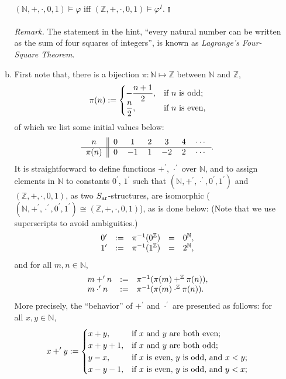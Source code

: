 \begin{enumerate}[1.]
\begin{enumerate}[(a)]
\ \\
\phantom{a} \hfill $(\mathbb{N}, +, \cdot, 0, 1) \models \varphi$ iff $(\mathbb{Z}, +, \cdot, 0, 1) \models \varphi^I$. \hfill $\talloblong$\\
\ \\
\textit{Remark.} The statement in the hint, ``every natural number can be written as the sum of four squares of integers'', is known as \emph{Lagrange's Four-Square Theorem}.
\item First note that, there is a bijection $\pi: \mathbb{N} \mapsto \mathbb{Z}$ between $\mathbb{N}$ and $\mathbb{Z}$,
\[
\pi(n) := \begin{cases}
\displaystyle -\frac{n + 1}{2}, & \mbox{if \(n\) is odd};\cr
\displaystyle \frac{n}{2}, & \mbox{if \(n\) is even},
\end{cases}
\]
of which we list some initial values below:
\[
\begin{tabular}{c||cccccc}
$n$ & $0$ & $1$ & $2$ & $3$ & $4$ & $\cdots$ \\ \hline
$\pi(n)$ & $0$ & $-1$ & $1$ & $-2$ & $2$ & $\cdots$
\end{tabular}.
\]
It is straightforward to define functions $+^\prime$, $\cdot^\prime$ over $\mathbb{N}$, and to assign elements in $\mathbb{N}$ to constants $0^\prime$, $1^\prime$ such that $(\mathbb{N}, +^\prime, \cdot^\prime, 0^\prime, 1^\prime)$ and $(\mathbb{Z}, +, \cdot, 0, 1)$, as two $S_{\mbox{\scriptsize ar}}$-structures, are isomorphic ($(\mathbb{N}, +^\prime, \cdot^\prime, 0^\prime, 1^\prime) \cong (\mathbb{Z}, +, \cdot, 0, 1)$), as is done below: (Note that we use superscripts to avoid ambiguities.)
\[
\begin{array}{lllll}
0^\prime & := & \pi^{-1}(0^\mathbb{Z}) & = & 0^\mathbb{N}, \cr
1^\prime & := & \pi^{-1}(1^\mathbb{Z}) & = & 2^\mathbb{N}, \cr
\end{array}
\]
and for all $m, n \in \mathbb{N}$,
\[
\begin{array}{lll}
m +^\prime n & := & \pi^{-1}(\pi(m) +^\mathbb{Z} \pi(n)), \cr
m \cdot^\prime n & := & \pi^{-1}(\pi(m) \cdot^\mathbb{Z} \pi(n)).
\end{array}
\]
More precisely, the ``behavior'' of $+^\prime$ and $\cdot^\prime$ are presented as follows: for all $x, y \in \mathbb{N}$,
\[
x +^\prime y := \begin{cases}
x + y, & \mbox{if \(x\) and \(y\) are both even}; \cr
x + y + 1, & \mbox{if \(x\) and \(y\) are both odd}; \cr
y - x, & \mbox{if \(x\) is even, \(y\) is odd, and \(x < y\)}; \cr
x - y - 1, & \mbox{if \(x\) is even, \(y\) is odd, and \(y < x\)}; \cr

\end{cases}\]
\end{enumerate}
\end{enumerate}
